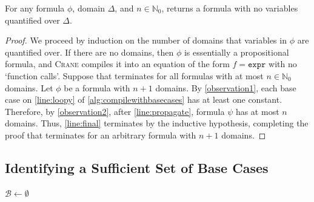 \documentclass[a4paper,UKenglish,cleveref, autoref, thm-restate]{lipics-v2021}
\newcommand{\expr}{\mathtt{expr}}
\begin{document}
\begin{observation}\label{observation2}
  For any formula $\phi$, domain $\Delta$, and $n \in \mathbb{N}_{0}$,
   returns a formula with no variables
  quantified over $\Delta$.
\end{observation}

\begin{proof}
  We proceed by induction on the number of domains that variables in $\phi$ are
  quantified over. If there are no domains, then $\phi$ is essentially a
  propositional formula, and \textsc{Crane} compiles it into an equation of the
  form $f = \expr$ with no `function calls'. Suppose that \CompileWithBaseCases
  terminates for all formulas with at most $n \in \mathbb{N}_{0}$ domains. Let
  $\phi$ be a formula with $n+1$ domains. By \cref{observation1}, each base case
  on \autoref{line:loopy} of \cref{alg:compilewithbasecases} has at least one
  constant. Therefore, by \cref{observation2}, after \autoref{line:propagate},
  formula $\psi$ has at most $n$ domains. Thus, \autoref{line:final} terminates
  by the inductive hypothesis, completing the proof that \CompileWithBaseCases
  terminates for an arbitrary formula with $n+1$ domains.
\end{proof}

\subsection{Identifying a Sufficient Set of Base Cases}\label{sec:identifying}

\begin{algorithm}[t]
  \caption{\protect{}}\label{alg:findbasecases}

  $\mathcal{B} \gets \emptyset$\;
\end{algorithm}
\end{document}
